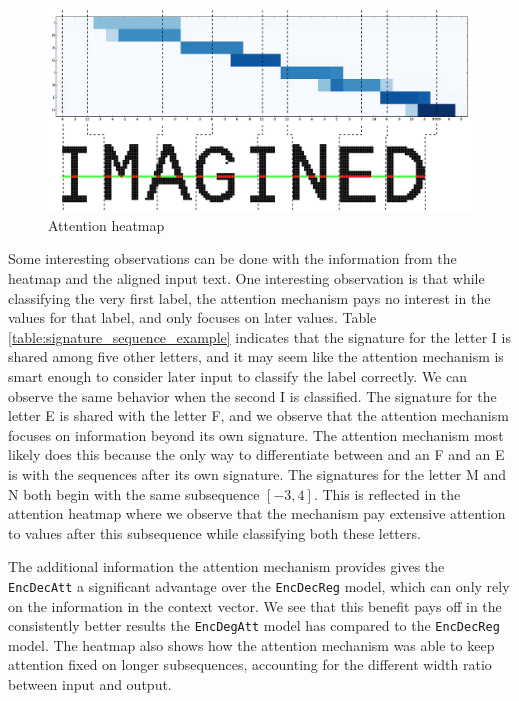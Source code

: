 \begin{figure}[ht]
    \centering
    \includegraphics[width=1\textwidth]{fig/conclusion/attention_illustrated.png}
    \caption{Attention heatmap}
    \label{fig:attention_heatmap}
\end{figure}

Some interesting observations can be done with the information from the heatmap and the aligned input text. One interesting observation is that while classifying the very first label, the attention mechanism pays no interest in the values for that label, and only focuses on later values. Table \ref{table:signature_sequence_example} indicates that the signature for the letter I is shared among five other letters, and it may seem like the attention mechanism is smart enough to consider later input to classify the label correctly. We can observe the same behavior when the second I is classified. The signature for the letter E is shared with the letter F, and we observe that the attention mechanism focuses on information beyond its own signature. The attention mechanism most likely does this because the only way to differentiate between and an F and an E is with the sequences after its own signature. The signatures for the letter M and N both begin with the same subsequence \([-3, 4]\). This is reflected in the attention heatmap where we observe that the mechanism pay extensive attention to values after this subsequence while classifying both these letters.

The additional information the attention mechanism provides gives the {\tt EncDecAtt} a significant advantage over the {\tt EncDecReg} model, which can only rely on the information in the context vector. We see that this benefit pays off in the consistently better results the {\tt EncDegAtt} model has compared to the {\tt EncDecReg} model. The heatmap also shows how the attention mechanism was able to keep attention fixed on longer subsequences, accounting for the different width ratio between input and output.